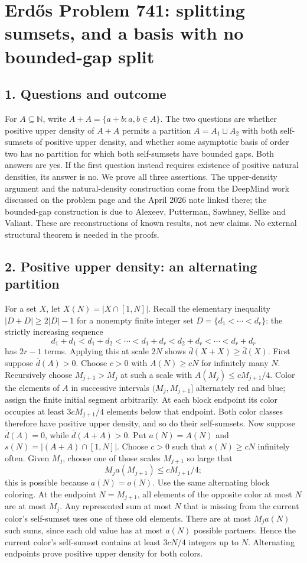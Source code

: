\section*{Erd\H{o}s Problem 741: splitting sumsets, and a basis with no bounded-gap split}
\subsection*{1. Questions and outcome}
For $A\subseteq\mathbb N$, write $A+A=\{a+b:a,b\in A\}$. The two questions are whether positive upper density of $A+A$ permits a partition $A=A_1\sqcup A_2$ with both self-sumsets of positive upper density, and whether some asymptotic basis of order two has no partition for which both self-sumsets have bounded gaps. Both answers are yes. If the first question instead requires existence of positive natural densities, its answer is no.
We prove all three assertions. The upper-density argument and the natural-density construction come from the DeepMind work discussed on the problem page and the April 2026 note linked there; the bounded-gap construction is due to Alexeev, Putterman, Sawhney, Sellke and Valiant. These are reconstructions of known results, not new claims. No external structural theorem is needed in the proofs.
\subsection*{2. Positive upper density: an alternating partition}
For a set $X$, let $X(N)=|X\cap[1,N]|$. Recall the elementary inequality $|D+D|\ge2|D|-1$ for a nonempty finite integer set $D=\{d_1<\cdots<d_r\}$: the strictly increasing sequence
\[
 d_1+d_1<d_1+d_2<\cdots<d_1+d_r<d_2+d_r<\cdots<d_r+d_r
\]
has $2r-1$ terms. Applying this at scale $2N$ shows $\overline d(X+X)\ge\overline d(X)$.
First suppose $\overline d(A)>0$. Choose $c>0$ with $A(N)\ge cN$ for infinitely many $N$. Recursively choose $M_{j+1}>M_j$ at such a scale with $A(M_j)\le cM_{j+1}/4$. Color the elements of $A$ in successive intervals $(M_j,M_{j+1}]$ alternately red and blue; assign the finite initial segment arbitrarily. At each block endpoint its color occupies at least $3cM_{j+1}/4$ elements below that endpoint. Both color classes therefore have positive upper density, and so do their self-sumsets.
Now suppose $\overline d(A)=0$, while $\overline d(A+A)>0$. Put $a(N)=A(N)$ and $s(N)=|(A+A)\cap[1,N]|$. Choose $c>0$ such that $s(N)\ge cN$ infinitely often. Given $M_j$, choose one of those scales $M_{j+1}$ so large that
\[
 M_j a(M_{j+1})\le cM_{j+1}/4;
\]
this is possible because $a(N)=o(N)$. Use the same alternating block coloring. At the endpoint $N=M_{j+1}$, all elements of the opposite color at most $N$ are at most $M_j$. Any represented sum at most $N$ that is missing from the current color's self-sumset uses one of these old elements. There are at most $M_j a(N)$ such sums, since each old value has at most $a(N)$ possible partners. Hence the current color's self-sumset contains at least $3cN/4$ integers up to $N$. Alternating endpoints prove positive upper density for both colors.
